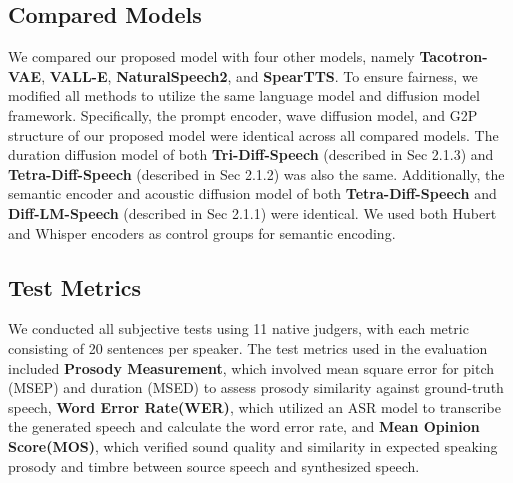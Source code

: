 \documentclass{article}
\begin{document}
\subsection{Compared Models}
We compared our proposed model with four other models, namely {\bf Tacotron-VAE}\cite{qiang2022style}, {\bf VALL-E}\cite{wang2023neural}, {\bf NaturalSpeech2}\cite{shen2023naturalspeech}, and {\bf SpearTTS}\cite{zhang2023speak}. To ensure fairness, we modified all methods to utilize the same language model and diffusion model framework. Specifically, the prompt encoder, wave diffusion model, and G2P\cite{qiang2022back}  structure of our proposed model were identical across all compared models. The duration diffusion model of both {\bf Tri-Diff-Speech} (described in Sec 2.1.3) and {\bf Tetra-Diff-Speech} (described in Sec 2.1.2) was also the same. Additionally, the semantic encoder and acoustic diffusion model of both {\bf Tetra-Diff-Speech} and {\bf Diff-LM-Speech} (described in Sec 2.1.1) were identical. We used both Hubert and Whisper encoders as control groups for semantic encoding.


\subsection{Test Metrics}
We conducted all subjective tests using 11 native judgers, with each metric consisting of 20 sentences per speaker. The test metrics used in the evaluation included {\bf Prosody Measurement}, which involved mean square error for pitch (MSEP) and duration (MSED) to assess prosody similarity against ground-truth speech, {\bf Word Error Rate(WER)}, which utilized an ASR model to transcribe the generated speech and calculate the word error rate, and {\bf Mean Opinion Score(MOS)}, which verified sound quality and similarity in expected speaking prosody and timbre between source speech and synthesized speech.
\end{document}
